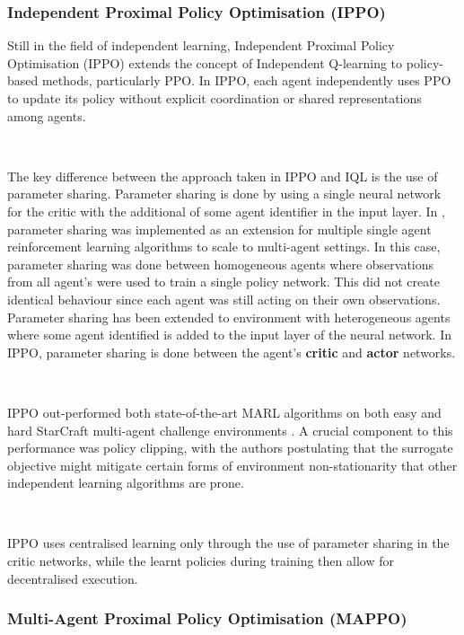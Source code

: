 \documentclass{article}
\begin{document}
\subsubsection{Independent Proximal Policy Optimisation (IPPO)}

Still in the field of independent learning, Independent Proximal Policy Optimisation (IPPO) \citet{witt2020independent} extends the concept of Independent Q-learning to policy-based methods, particularly PPO. In IPPO, each agent independently uses PPO to update its policy without explicit coordination or shared representations among agents. 

\


The key difference between the approach taken in IPPO and IQL is the use of parameter sharing. Parameter sharing is done by using a single neural network for the critic with the additional of some agent identifier in the input layer. In \citet{gupta2017cooperative}, parameter sharing was implemented as an extension for multiple single agent reinforcement learning algorithms to scale to multi-agent settings. In this case, parameter sharing was done between homogeneous agents where observations from all agent's were used to train a single policy network. This did not create identical behaviour since each agent was still acting on their own observations. Parameter sharing has been extended to environment with heterogeneous agents where some agent identified is added to the input layer of the neural network. In IPPO, parameter sharing is done between the agent's \textbf{critic} and \textbf{actor} networks.

\

IPPO out-performed both state-of-the-art MARL algorithms on both easy and hard StarCraft multi-agent challenge environments \citep{witt2020independent}. A crucial component to this performance was policy clipping, with the authors postulating that the surrogate objective might mitigate certain forms of environment non-stationarity that other independent learning algorithms are prone.

\

IPPO uses centralised learning only through the use of parameter sharing in the critic networks, while the learnt policies during training then allow for decentralised execution.

\subsubsection{Multi-Agent Proximal Policy Optimisation (MAPPO)}
\end{document}
